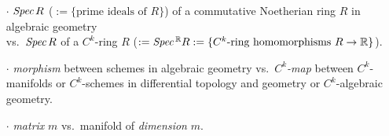 \documentclass[11pt]{article}
\numberwithin{equation}{subsection}
\newcommand{\Spec}{\mbox{\it Spec}\,}
\begin{document}
\begin{itemize}
  \item[$\cdot$]
   $\Spec R $ ($:=\{\mbox{prime ideals of $R$}\}$)
         of a commutative Noetherian ring $R$  in algebraic geometry\\
   vs.\ $\Spec R$ of a $C^k$-ring $R$
  ($:=\Spec^{\Bbb R}R :=\{\mbox{$C^k$-ring homomorphisms $R\rightarrow {\Bbb R}$}\}$).

  \item[$\cdot$]
  {\it morphism} between schemes in algebraic geometry
    vs.\ {\it $C^k$-map} between $C^k$-manifolds or $C^k$-schemes
         	in differential topology and geometry or $C^k$-algebraic geometry.
			
  \item[$\cdot$]			
   {\it matrix} $m$ vs.\ manifold of {\it dimension} $m$.
\end{itemize}



\bigskip
\end{document}
